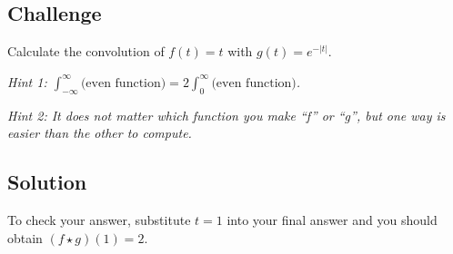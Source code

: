\subsection*{Challenge}
Calculate the convolution of $f(t)=t$ with $g(t)=e^{-|t|}$.

\emph{Hint 1: $\int_{-\infty}^{\infty} \text{(even function)} = 2 \int_{0}^{\infty} \text{(even function)}$.}

\emph{Hint 2: It does not matter which function you make ``f'' or ``g'', but one way is easier than the other to compute.}

\subsection*{Solution}
To check your answer, substitute $t=1$ into your final answer and you should obtain $(f \star g)(1) = 2$.




%
%
%
%
%




